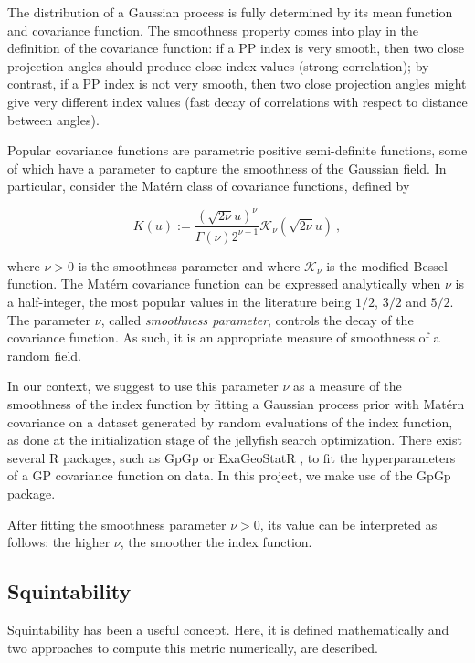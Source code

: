 \documentclass[
  number,
  preprint,
  3p]{elsarticle}
\begin{document}
The distribution of a Gaussian process is fully determined by its mean
function and covariance function. The smoothness property comes into
play in the definition of the covariance function: if a PP index is very
smooth, then two close projection angles should produce close index
values (strong correlation); by contrast, if a PP index is not very
smooth, then two close projection angles might give very different index
values (fast decay of correlations with respect to distance between
angles).

Popular covariance functions are parametric positive semi-definite
functions, some of which have a parameter to capture the smoothness of
the Gaussian field. In particular, consider the Matérn class of
covariance functions, defined by

\[
K(u):=\frac{(\sqrt{2\nu}u)^{\nu}}{\Gamma(\nu)2^{\nu-1}}\mathcal{K}_{\nu}(\sqrt{2\nu}u)\ ,
\]

where \(\nu>0\) is the smoothness parameter and where
\(\mathcal{K}_\nu\) is the modified Bessel function. The Matérn
covariance function can be expressed analytically when \(\nu\) is a
half-integer, the most popular values in the literature being \(1/2\),
\(3/2\) and \(5/2\). The parameter \(\nu\), called \emph{smoothness
parameter}, controls the decay of the covariance function. As such, it
is an appropriate measure of smoothness of a random field.

In our context, we suggest to use this parameter \(\nu\) as a measure of
the smoothness of the index function by fitting a Gaussian process prior
with Matérn covariance on a dataset generated by random evaluations of
the index function, as done at the initialization stage of the jellyfish
search optimization. There exist several R packages, such as GpGp
\citep{guinness2021gpgp} or ExaGeoStatR \citep{abdulah2023large}, to fit
the hyperparameters of a GP covariance function on data. In this
project, we make use of the GpGp package.

After fitting the smoothness parameter \(\nu>0\), its value can be
interpreted as follows: the higher \(\nu\), the smoother the index
function.

\subsection{Squintability}\label{sec-squintability}

Squintability has been a useful concept. Here, it is defined
mathematically and two approaches to compute this metric numerically,
are described.
\end{document}
